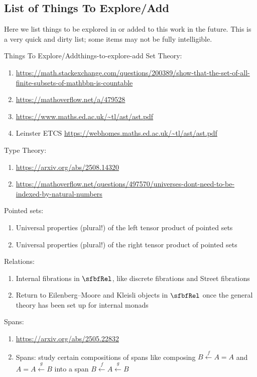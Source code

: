 \subsection{List of Things To Explore/Add}\label{subsection-things-to-explore-add}
Here we list things to be explored in or added to this work in the future. This is a very quick and dirty list; some items may not be fully intelligible.
\begin{remark}{Things To Explore/Add}{things-to-explore-add}%
    Set Theory:
    \begin{enumerate}
        \item \url{https://math.stackexchange.com/questions/200389/show-that-the-set-of-all-finite-subsets-of-mathbbn-is-countable}
        \item \url{https://mathoverflow.net/a/479528}
        \item \url{https://www.maths.ed.ac.uk/~tl/ast/ast.pdf}
        \item Leinster ETCS \url{https://webhomes.maths.ed.ac.uk/~tl/ast/ast.pdf}
    \end{enumerate}
    Type Theory:
    \begin{enumerate}
        \item \url{https://arxiv.org/abs/2508.14320}
        \item \url{https://mathoverflow.net/questions/497570/universes-dont-need-to-be-indexed-by-natural-numbers}
    \end{enumerate}
    Pointed sets:
    \begin{enumerate}
        \item Universal properties (plural!) of the left tensor product of pointed sets
        \item Universal properties (plural!) of the right tensor product of pointed sets
    \end{enumerate}
    Relations:
    \begin{enumerate}
        \item Internal fibrations in $\sfbfRel$, like discrete fibrations and Street fibrations
        \item Return to Eilenberg--Moore and Kleisli objects in $\sfbfRel$ once the general theory has been set up for internal monads
    \end{enumerate}
    Spans:
    \begin{enumerate}
        \item \url{https://arxiv.org/abs/2505.22832}
        \item Spans: study certain compositions of spans like composing $B\xleftarrow{f}A=A$ and $A=A\xleftarrow{g}B$ into a span $B\xleftarrow{f}A\xleftarrow{g}B$

\end{enumerate}
\end{remark}
